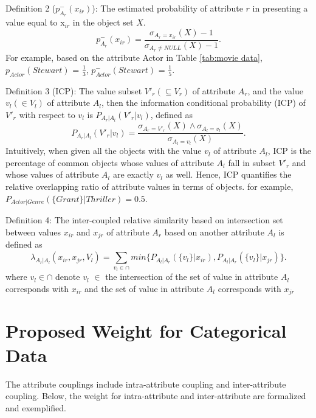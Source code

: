 \documentclass[review]{elsarticle}
\begin{document}
Definition 2 \cite{TiagoC2015SimilarityMeasure} ($p_{A_r}^-(x_{ir})$): The estimated probability of attribute $r$ in presenting a value equal to x$_{ir}$ in the object set $X$.
\begin{equation}
p_{A_r}^-(x_{ir}) = \frac{\sigma_{A_r = x_{ir}}(X) - 1}{\sigma_{A_r \neq NULL}(X) - 1}.
\label{equ2}
\end{equation}
For example, based on the attribute Actor in Table \ref{tab:movie data}, $p_{Actor}(Stewart)$ = $\frac{1}{3}$,  $p_{Actor}^-(Stewart)$ = $\frac{1}{5}$.

Definition 3 (ICP): The value subset ${V'_r} (\subseteq V_r)$ of attribute $A_r$, and the value $v_l (\in V_l)$ of attribute $A_l$, then the information conditional probability (ICP) of $V'_r$ with respect to $v_l$ is $P_{{A_r}|{A_l}}(V'_r | v_l)$, defined as \cite{WangC2015CADO}
\begin{equation}
P_{{A_r}|{A_l}}(V'_r | v_l) = \frac{\sigma_{A_r = V'_r}(X) \wedge \sigma_{A_l = v_l}(X)}{\sigma_{A_l = v_l}(X)}.
\label{equ3}
\end{equation}
Intuitively, when given all the objects with the value $v_l$ of attribute $A_l$, ICP is the percentage of common objects whose values of attribute $A_l$ fall in subset $V'_r$ and whose values of attribute $A_l$ are exactly $v_l$ as well. Hence, ICP quantifies the relative overlapping ratio of attribute values in terms of objects. for example, $P_{Actor|Genre}(\{Grant\} | Thriller) = 0.5$.

Definition 4: The inter-coupled relative similarity based on intersection set between values $x_{ir}$ and $x_{jr}$ of attribute $A_r$ based on another attribute $A_l$ is defined as \cite{WangC2015CADO}
\begin{equation}
\lambda_{A_r|A_l}(x_{ir},x_{jr},V_l) = \sum_{v_l \in \cap}^{}min\{P_{A_l|A_r}(\{v_l\}|x_{ir}),P_{A_l|A_r}(\{v_l\}|x_{jr})\}.
\label{equ4}
\end{equation}
where $v_l \in \cap$ denote $v_l$ $\in$ the intersection of the set of value in attribute $A_l$ corresponds with $x_{ir}$ and the set of value in attribute $A_l$ corresponds with $x_{jr}$

\section{Proposed Weight for Categorical Data}
The attribute couplings include intra-attribute coupling and inter-attribute coupling. Below, the weight for intra-attribute and inter-attribute are formalized and exemplified.
\end{document}
